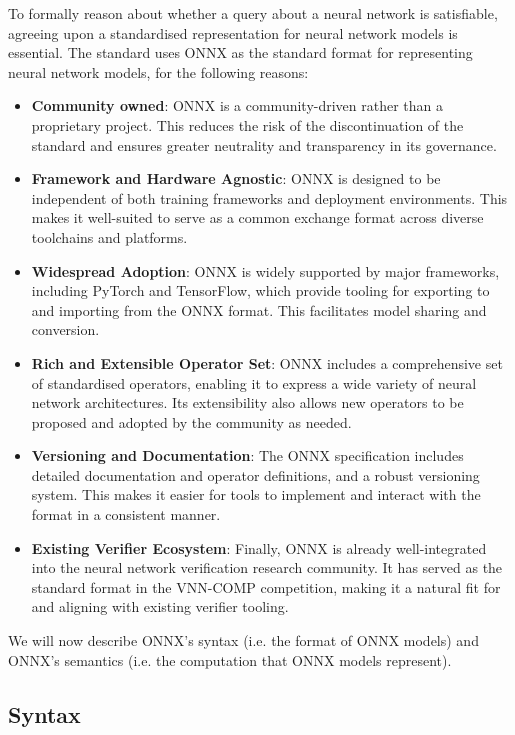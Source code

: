To formally reason about whether a query about a neural network is satisfiable, agreeing upon a standardised representation for neural network models is essential.
The \vnnlib{} standard uses ONNX as the standard format for representing neural network models, for the following reasons:
\begin{itemize}
\item \textbf{Community owned}: ONNX is a community-driven rather than a proprietary project. This reduces the risk of the discontinuation of the standard and ensures greater neutrality and transparency in its governance.
\item \textbf{Framework and Hardware Agnostic}: ONNX is designed to be independent of both training frameworks and deployment environments. This makes it well-suited to serve as a common exchange format across diverse toolchains and platforms.
\item \textbf{Widespread Adoption}: ONNX is widely supported by major frameworks, including PyTorch and TensorFlow, which provide tooling for exporting to and importing from the ONNX format. This facilitates model sharing and conversion.
\item \textbf{Rich and Extensible Operator Set}: ONNX includes a comprehensive set of standardised operators, enabling it to express a wide variety of neural network architectures. Its extensibility also allows new operators to be proposed and adopted by the community as needed.

\item \textbf{Versioning and Documentation}: The ONNX specification includes detailed documentation and operator definitions, and a robust versioning system. This makes it easier for tools to implement and interact with the format in a consistent manner.

\item \textbf{Existing Verifier Ecosystem}: Finally, ONNX is already well-integrated into the neural network verification research community. It has served as the standard format in the VNN-COMP competition, making it a natural fit for \vnnlib{} and aligning with existing verifier tooling.
\end{itemize}
We will now describe ONNX's syntax (i.e. the format of ONNX models) and ONNX's semantics (i.e. the computation that ONNX models represent).

\subsection{Syntax}
\label{sec:onnx_overview}

